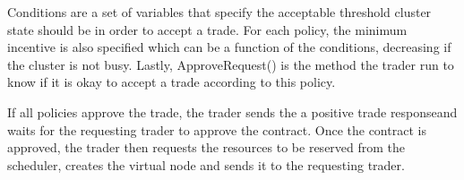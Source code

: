 Conditions are a set of variables that specify the acceptable threshold cluster
state should be in order to accept a trade. For each policy, the minimum
incentive is also specified which can be a function of the conditions,
decreasing if the cluster is not busy. Lastly, ApproveRequest() is the method
the trader run to know if it is okay to accept a trade according to this
policy.

If all policies approve the trade, the trader sends the a positive trade responseand waits for the requesting trader to approve the contract. Once the contract is approved, the trader then requests the resources to be reserved from the scheduler, creates the virtual node and sends it to the requesting trader. 






